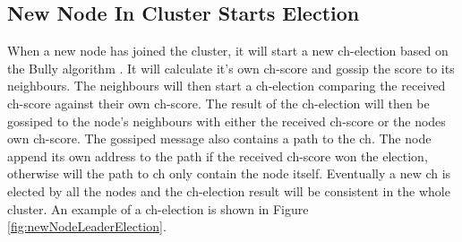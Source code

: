 \documentclass[USenglish]{uit-thesis}
\begin{document}
\subsection{New Node In Cluster Starts Election}
When a new node has joined the cluster, it will start a new \gls{ch}-election based on the Bully algorithm \cite{bully}. It will calculate it's own \gls{ch}-score and gossip the score to its neighbours. The neighbours will then start a \gls{ch}-election comparing the received \gls{ch}-score against their own \gls{ch}-score. The result of the \gls{ch}-election will then be gossiped to the node's neighbours with either the received \gls{ch}-score or the nodes own \gls{ch}-score. The gossiped message also contains a path to the \gls{ch}. The node append its own address to the path if the received \gls{ch}-score won the election, otherwise will the path to \gls{ch} only contain the node itself. Eventually a new \gls{ch} is elected by all the nodes and the \gls{ch}-election result will be consistent in the whole cluster. An example of a \gls{ch}-election is shown in Figure \ref{fig:newNodeLeaderElection}.
\end{document}
